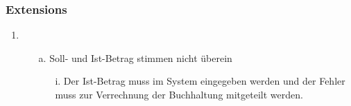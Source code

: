 \documentclass[./detailed_overview_usecases.tex]{subfiles}
\begin{document}
    \subsubsection*{Extensions}
    \begin{enumerate}
        \item
        \begin{itemize}
            \item[a.] Soll- und Ist-Betrag stimmen nicht überein
            \begin{itemize}
                \item[i.] Der Ist-Betrag muss im System eingegeben werden und der Fehler
                muss zur Verrechnung der Buchhaltung mitgeteilt werden.
            \end{itemize}
        \end{itemize}
    \end{enumerate}
\end{document}
